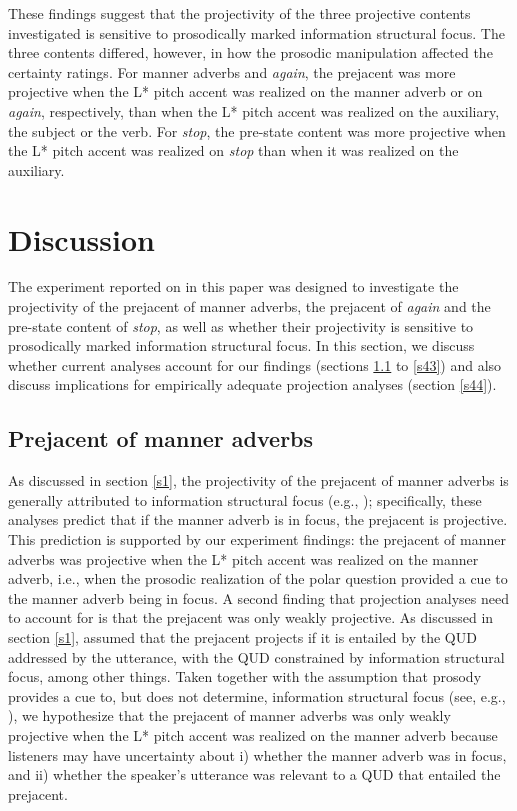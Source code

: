 \documentclass[a4paper,12pt]{article}
\newcommand{\6}{\mbox{$[\hspace*{-.6mm}[$}}
\newcommand{\9}{\mbox{$]\hspace*{-.6mm}]$}}
\begin{document}
These findings suggest that the projectivity of the three projective contents investigated is sensitive to prosodically marked information structural focus. The three contents differed, however, in how the prosodic manipulation affected the certainty ratings. For manner adverbs and {\em again}, the prejacent was more projective when the L* pitch accent was realized on the manner adverb or on {\em again}, respectively, than when the L* pitch accent was realized on the auxiliary, the subject or the verb. For {\em stop}, the pre-state content was more projective when the L* pitch accent was realized on {\em stop} than when it was realized on the auxiliary.

\section{Discussion}\label{s4}

The experiment reported on in this paper was designed to investigate the projectivity of the prejacent of manner adverbs, the prejacent of {\em again} and the pre-state content of {\em stop}, as well as whether their projectivity is sensitive to prosodically marked information structural focus. In this section, we discuss whether current analyses account for our findings (sections \ref{s41} to \ref{s43}) and also discuss implications for empirically adequate projection analyses (section \ref{s44}).

\subsection{Prejacent of manner adverbs}\label{s41}

As discussed in section \ref{s1}, the projectivity of the prejacent of manner adverbs is generally attributed to information structural focus (e.g., \citealt{abrusan2013,stevens-etal2017}); specifically, these analyses predict that if the manner adverb is in focus, the prejacent is projective. This prediction is supported by our experiment findings: the prejacent of manner adverbs was projective when the L* pitch accent was realized on the manner adverb, i.e., when the prosodic realization of the polar question provided a cue to the manner adverb being in focus. A second finding that projection analyses need to account for is that the prejacent was only weakly projective. As discussed in section \ref{s1}, \citet{stevens-etal2017} assumed that the prejacent projects if it is entailed by the QUD addressed by the utterance, with the QUD constrained by information structural focus, among other things. Taken together with the assumption that prosody provides a cue to, but does not determine, information structural focus (see, e.g., \citealt{breen-etal10,tonhauser-prosody}),  we hypothesize that the prejacent of manner adverbs was only weakly projective when the L* pitch accent was realized on the manner adverb because listeners may have uncertainty about i) whether the manner adverb was in focus, and ii) whether the speaker's utterance was relevant to a QUD that entailed the prejacent. 
\end{document}
